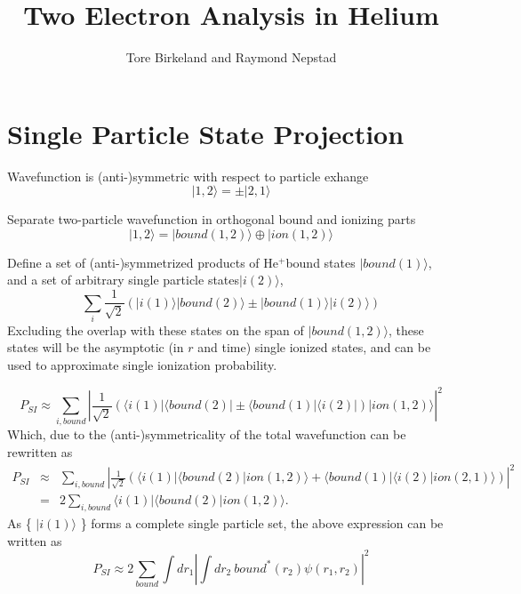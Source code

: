 \documentclass[a4paper,12pt]{report}
\title{Two Electron Analysis in Helium}
\author{Tore Birkeland and Raymond Nepstad}
\newcommand{\bra}[1]{\ensuremath{\langle #1 |}}
\newcommand{\ket}[1]{\ensuremath{| #1 \rangle}}
\newcommand{\innerprod}[2]{\langle #1 | #2 \rangle}
\newcommand{\Hep}{He$^+$}
\begin{document}
\section{Single Particle State Projection}

Wavefunction is (anti-)symmetric with respect to particle exhange
\begin{equation}
	\ket{1,2} = \pm \ket{2,1}
\end{equation}

Separate two-particle wavefunction in orthogonal bound and ionizing parts
\begin{equation}
	\ket{1,2} = \ket{bound(1,2)} \oplus \ket{ion(1,2)}
\end{equation}

Define a set of (anti-)symmetrized products of \Hep bound states $\ket{bound(1)}$, and a set of arbitrary single particle states\ket{i(2)},
\begin{equation}
	\sum_i \frac{1}{\sqrt{2}} \left( \ket{i(1)}\ket{bound(2)} \pm \ket{bound(1)}\ket{i(2)} \right)
\end{equation}
Excluding the overlap with these states on the span of $\ket{bound(1,2)}$, these states will be the asymptotic (in $r$ and time) single ionized states, and can be used to approximate single ionization probability.

\begin{equation}
	P_{SI} \approx \sum_{i,bound} 
		| \frac{1}{\sqrt{2}} \left( \bra{i(1)}\bra{bound(2)} \pm \bra{bound(1)}\bra{i(2)} \right) 
		\ket{ion(1,2)} |^2
\end{equation}
Which, due to the (anti-)symmetricality of the total wavefunction can be rewritten as
\begin{eqnarray}
	P_{SI} &\approx& \sum_{i,bound} 
		| \frac{1}{\sqrt{2}} \left( \bra{i(1)}\innerprod{bound(2)}{ion(1,2)} + \bra{bound(1)}\innerprod{i(2)}{ion(2,1)} \right) |^2 \\
		&=& 2 \sum_{i, bound} \bra{i(1)}\innerprod{bound(2)}{ion(1,2)}.
\end{eqnarray}
As \{ $\ket{i(1)}$ \} forms a complete single particle set, the above expression can be written as
\begin{equation}
	P_{SI} \approx 2 \sum_{bound} \int dr_1 | \int dr_2 \  bound^*(r_2) \psi(r_1, r_2) |^2 
\end{equation}
\end{document}
